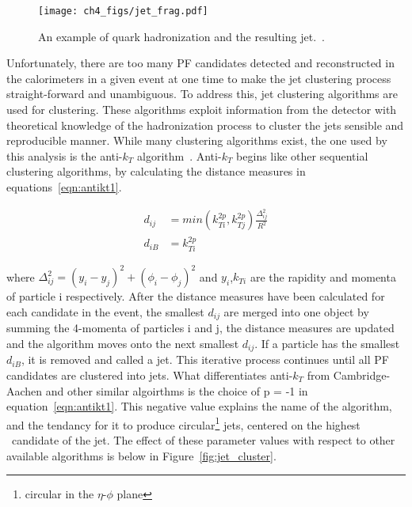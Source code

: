 \begin{figure}[hbtp]
 \begin{center}
   \texttt{[image: ch4\_figs/jet\_frag.pdf]}
   \caption{An example of quark hadronization and the resulting jet.~\cite{frag}.}
   \label{fig:frag}
 \end{center}
\end{figure}
 
Unfortunately, there are too many PF candidates detected and reconstructed in the calorimeters in a given event at one time to make the jet clustering process straight-forward
and unambiguous. To address this, jet clustering algorithms are used for clustering. These algorithms exploit information from the detector with theoretical knowledge of the
hadronization process to cluster the jets sensible and reproducible manner.
While many clustering algorithms exist, the one used by this analysis is the anti-$k_{T}$ algorithm~\cite{antikt}. Anti-$k_{T}$ begins like other sequential clustering algorithms,
by calculating the distance measures in equations~\ref{eqn:antikt1}. 

\begin{equation}
\begin{aligned}
\label{eqn:antikt1}
d_{ij} &= min(k^{2p}_{Ti},k^{2p}_{Tj})\frac{\Delta_{ij}^{2}}{R^{2}} \\ d_{iB} &= k^{2p}_{Ti}
\end{aligned} 
\end{equation}

\noindent where $\Delta_{ij}^{2} = (y_{i}-y_{j})^{2} + (\phi_{i}-\phi_{j})^{2}$ and $y_{i}$,$k_{Ti}$ are the rapidity and momenta of particle i respectively. After the
distance measures have been calculated for each candidate in the event, the smallest $d_{ij}$ are merged into one object by summing the 4-momenta of particles i and j, the
distance measures are updated and the algorithm moves onto the next smallest $d_{ij}$. If a particle has the smallest $d_{iB}$, it is removed and called a jet. This
iterative process continues until all PF candidates are clustered into jets. What differentiates anti-$k_{T}$ from Cambridge-Aachen and other similar algoirthms is the choice
of p = -1 in equation~\ref{eqn:antikt1}. This negative value explains the name of the algorithm, and the tendancy for it to produce circular\footnote{circular in the
$\eta$-$\phi$ plane} jets, centered on the highest \pt~candidate of the jet. The effect of these parameter values with respect to other available algorithms is below in
Figure~\ref{fig:jet_cluster}.

